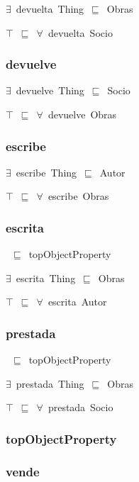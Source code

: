 \documentclass{article}
\begin{document}
\ensuremath{\exists}~devuelta~Thing~\ensuremath{\sqsubseteq}~Obras

\ensuremath{\top}~\ensuremath{\sqsubseteq}~\ensuremath{\forall}~devuelta~Socio

\subsubsection*{devuelve}

\ensuremath{\exists}~devuelve~Thing~\ensuremath{\sqsubseteq}~Socio

\ensuremath{\top}~\ensuremath{\sqsubseteq}~\ensuremath{\forall}~devuelve~Obras

\subsubsection*{escribe}

\ensuremath{\exists}~escribe~Thing~\ensuremath{\sqsubseteq}~Autor

\ensuremath{\top}~\ensuremath{\sqsubseteq}~\ensuremath{\forall}~escribe~Obras

\subsubsection*{escrita}

~\ensuremath{\sqsubseteq}~topObjectProperty

\ensuremath{\exists}~escrita~Thing~\ensuremath{\sqsubseteq}~Obras

\ensuremath{\top}~\ensuremath{\sqsubseteq}~\ensuremath{\forall}~escrita~Autor

\subsubsection*{prestada}

~\ensuremath{\sqsubseteq}~topObjectProperty

\ensuremath{\exists}~prestada~Thing~\ensuremath{\sqsubseteq}~Obras

\ensuremath{\top}~\ensuremath{\sqsubseteq}~\ensuremath{\forall}~prestada~Socio

\subsubsection*{topObjectProperty}

\subsubsection*{vende}
\end{document}
